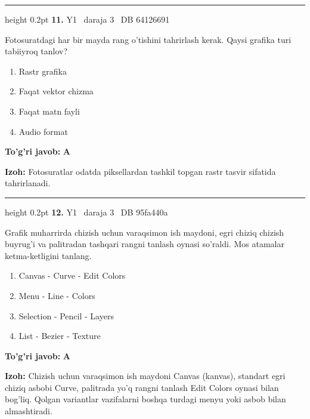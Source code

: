 \documentclass[10pt,a4paper,oneside]{article}
\begin{document}
\vspace{2mm}\hrule height 0.2pt \vspace{4mm}
\hypertarget{q11}{\textbf{\color{ink}11.}}  {\color{muted}\scriptsize Y1 \textbullet\ daraja 3 \textbullet\ DB 64126691}
\par
Fotosuratdagi har bir mayda rang o'tishini tahrirlash kerak. Qaysi grafika turi tabiiyroq tanlov?
\begin{enumerate}[label=\Alph*),leftmargin=9mm]
\item Rastr grafika
\item Faqat vektor chizma
\item Faqat matn fayli
\item Audio format
\end{enumerate}
\begin{tcolorbox}[enhanced,breakable,colback=teal!4,colframe=teal!45!black,boxrule=0.45pt,arc=1.2mm,left=2.8mm,right=2.8mm,top=2mm,bottom=2mm,before skip=2mm,after skip=2mm]
\textbf{\color{teal}To'g'ri javob:} \textbf{A}
\par\smallskip
\textbf{Izoh:} Fotosuratlar odatda piksellardan tashkil topgan rastr tasvir sifatida tahrirlanadi.
\end{tcolorbox}
\vspace{2mm}\hrule height 0.2pt \vspace{4mm}
\hypertarget{q12}{\textbf{\color{ink}12.}}  {\color{muted}\scriptsize Y1 \textbullet\ daraja 3 \textbullet\ DB 95fa440a}
\par
Grafik muharrirda chizish uchun varaqsimon ish maydoni, egri chiziq chizish buyrug'i va palitradan tashqari rangni tanlash oynasi so'raldi. Mos atamalar ketma-ketligini tanlang.
\begin{enumerate}[label=\Alph*),leftmargin=9mm]
\item Canvas - Curve - Edit Colors
\item Menu - Line - Colors
\item Selection - Pencil - Layers
\item List - Bezier - Texture
\end{enumerate}
\begin{tcolorbox}[enhanced,breakable,colback=teal!4,colframe=teal!45!black,boxrule=0.45pt,arc=1.2mm,left=2.8mm,right=2.8mm,top=2mm,bottom=2mm,before skip=2mm,after skip=2mm]
\textbf{\color{teal}To'g'ri javob:} \textbf{A}
\par\smallskip
\textbf{Izoh:} Chizish uchun varaqsimon ish maydoni Canvas (kanvas), standart egri chiziq asbobi Curve, palitrada yo'q rangni tanlash Edit Colors oynasi bilan bog'liq. Qolgan variantlar vazifalarni boshqa turdagi menyu yoki asbob bilan almashtiradi.
\end{tcolorbox}
\end{document}
